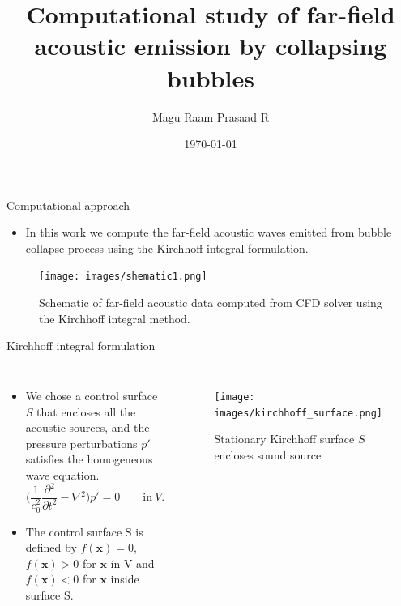 \documentclass[10pt, aspectratio=169]{beamer}
\title{Computational study of far-field acoustic emission by collapsing bubbles}
\date{\today}
\author[shortname]{Magu Raam Prasaad R}
\institute[shortinst]{Indian Institute of Science, Bangalore}
\begin{document}
\begin{frame}
	\maketitle
\end{frame}

\begin{frame}{Computational approach}
	
	\begin{itemize}
		\item In this work we compute the far-field acoustic waves emitted from bubble collapse process using the Kirchhoff integral formulation.
	\end{itemize}

	\begin{figure}
		\centering
		\texttt{[image: images/shematic1.png]}
		\caption{Schematic of far-field acoustic data computed from CFD solver using the Kirchhoff integral method.}
	\end{figure}		

\end{frame}

\begin{frame}{Kirchhoff integral formulation}
	\begin{columns}
		\begin{itemize}
			\item We chose a control surface $S$ that encloses all the acoustic sources, and the pressure perturbations $p'$ satisfies the homogeneous wave equation.
			\begin{equation}\label{Wave equation}
				\Bigg( \frac{1}{c_{0}^2}\frac{\partial{}^{2}}{\partial{t}^{2}}- \nabla{}^{2} \Bigg) p' = 0 \quad \quad \textrm{in} \ V.
			\end{equation}
			\item The control surface S is defined by $f(\mathbf{x}) = 0$, $f(\mathbf{x}) > 0$ for $\mathbf{x}$ in V and $f(\mathbf{x}) < 0$ for $\mathbf{x}$ inside surface S.
		\end{itemize}
				
		\begin{figure}[h]
			\texttt{[image: images/kirchhoff\_surface.png]}
			\caption{Stationary Kirchhoff surface $S$ encloses sound source}	
		\end{figure}
							
	\end{columns}
\end{frame}
\end{document}

